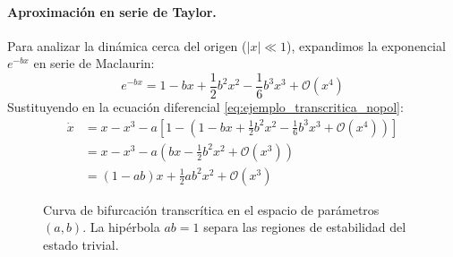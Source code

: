 \paragraph{Aproximación en serie de Taylor.}
Para analizar la dinámica cerca del origen ($|x| \ll 1$), expandimos la exponencial $e^{-bx}$ en serie de Maclaurin:
\begin{equation}
    e^{-bx} = 1 - bx + \frac{1}{2}b^2 x^2 - \frac{1}{6}b^3 x^3 + \mathcal{O}(x^4)
\end{equation}
Sustituyendo en la ecuación diferencial \eqref{eq:ejemplo_transcritica_nopol}:
\begin{align}
    \dot{x} &= x - x^3 - a\left[1 - \left(1 - bx + \frac{1}{2}b^2 x^2 - \frac{1}{6}b^3 x^3 + \mathcal{O}(x^4)\right)\right] \nonumber \\
    &= x - x^3 - a\left(bx - \frac{1}{2}b^2 x^2 + \mathcal{O}(x^3)\right) \nonumber \\
    &= (1 - ab)x + \frac{1}{2}ab^2 x^2 + \mathcal{O}(x^3)
    \label{eq:expansion_transcritica_ab}
\end{align}

\begin{figure}[htbp]
\centering
{}
\caption{Curva de bifurcación transcrítica en el espacio de parámetros $(a, b)$. La hipérbola $ab = 1$ separa las regiones de estabilidad del estado trivial.}
\label{fig:curva_bifurcacion_ab}
\end{figure}

